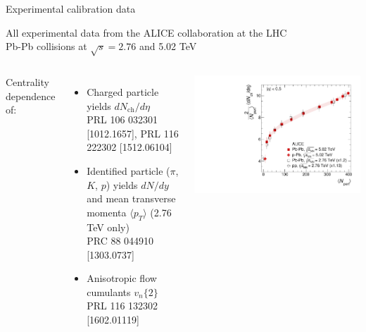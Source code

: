 \documentclass{beamer}
\begin{document}
\begin{frame}{Experimental calibration data}
    \begin{center}
    All experimental data from the ALICE collaboration at the LHC \\
    Pb-Pb collisions at $\sqrt s = 2.76$ and 5.02 TeV
  \end{center}
  \begin{columns}
    Centrality dependence of: \\[1ex]
    \begin{itemize}
      \setlength{\itemsep}{1.5ex}
      \item Charged particle yields $dN_\text{ch}/d\eta$ \\
        {\tiny PRL 106 032301 [1012.1657], PRL 116 222302 [1512.06104]}
      \item Identified particle ($\pi$, $K$, $p$) yields $dN/dy$
        and mean transverse momenta $\langle p_T \rangle$ (2.76 TeV only) \\
        {\tiny PRC 88 044910 [1303.0737]}
      \item Anisotropic flow cumulants $v_n\{2\}$ \\
        {\tiny PRL 116 132302 [1602.01119]}
    \end{itemize}
    \centering
    \includegraphics[height=.25\textheight]{nch}
    \hfill

\end{columns}
\end{frame}
\end{document}
